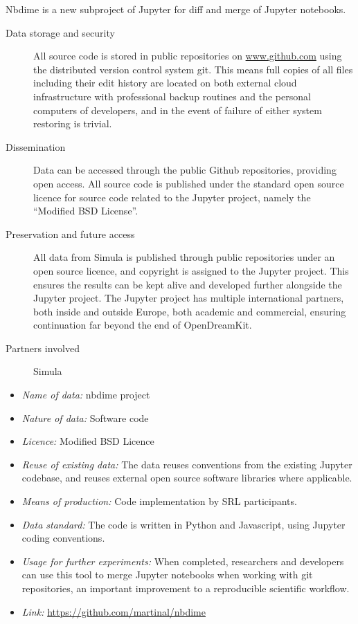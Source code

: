 \documentclass{deliverablereport}
\begin{document}
Nbdime is a new subproject of Jupyter for diff and merge of Jupyter notebooks.
\begin{description}

\item[Data storage and security] All source code is stored in public repositories on \url{www.github.com} using the distributed version control system git. This means full copies of all files including their edit history are located on both external cloud infrastructure with professional backup routines and the personal computers of developers, and in the event of failure of either system restoring is trivial.
\item[Dissemination] Data can be accessed through the public Github repositories, providing open access. All source code is published under the standard open source licence for source code related to the Jupyter project, namely the ``Modified BSD License''.
\item[Preservation and future access] All data from Simula is published through public repositories under an open source licence, and copyright is assigned to the Jupyter project. This ensures the results can be kept alive and developed further alongside the Jupyter project. The Jupyter project has multiple international partners, both inside and outside Europe, both academic and commercial, ensuring continuation far beyond the end of OpenDreamKit.
\item[Partners involved] Simula

\end{description}

\begin{itemize}
\item\textit{Name of data:} nbdime project
\item\textit{Nature of data:} Software code
\item\textit{Licence:} Modified BSD Licence
\item\textit{Reuse of existing data:} The data reuses conventions from the existing Jupyter codebase, and reuses external open source software libraries where applicable.
\item\textit{Means of production:} Code implementation by SRL participants.
\item\textit{Data standard:} The code is written in Python and Javascript, using Jupyter coding conventions.
\item\textit{Usage for further experiments:} When completed, researchers and developers can use this tool to merge Jupyter notebooks when working with git repositories, an important improvement to a reproducible scientific workflow.
\item\textit{Link:} \href{https://github.com/martinal/nbdime}{https://github.com/martinal/nbdime}
\end{itemize}
\end{document}
